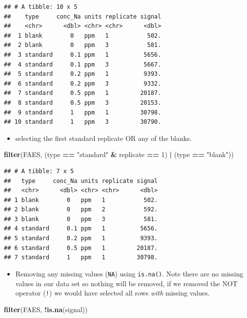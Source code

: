 \documentclass[
]{book}
\newenvironment{Shaded}{\begin{snugshade}}{\end{snugshade}}
\newcommand{\DecValTok}[1]{\textcolor[rgb]{0.00,0.00,0.81}{#1}}
\newcommand{\FunctionTok}[1]{\textcolor[rgb]{0.13,0.29,0.53}{\textbf{#1}}}
\newcommand{\NormalTok}[1]{#1}
\newcommand{\SpecialCharTok}[1]{\textcolor[rgb]{0.81,0.36,0.00}{\textbf{#1}}}
\newcommand{\StringTok}[1]{\textcolor[rgb]{0.31,0.60,0.02}{#1}}
\providecommand{\tightlist}{%
  \setlength{\itemsep}{0pt}\setlength{\parskip}{0pt}}
\begin{document}
\begin{verbatim}
## # A tibble: 10 x 5
##    type     conc_Na units replicate signal
##    <chr>      <dbl> <chr> <chr>      <dbl>
##  1 blank        0   ppm   1           502.
##  2 blank        0   ppm   3           581.
##  3 standard     0.1 ppm   1          5656.
##  4 standard     0.1 ppm   3          5667.
##  5 standard     0.2 ppm   1          9393.
##  6 standard     0.2 ppm   3          9332.
##  7 standard     0.5 ppm   1         20187.
##  8 standard     0.5 ppm   3         20153.
##  9 standard     1   ppm   1         30798.
## 10 standard     1   ppm   3         30790.
\end{verbatim}

\begin{itemize}
\tightlist
\item
  selecting the first standard replicate OR any of the blanks.
\end{itemize}

\begin{Shaded}
\begin{Highlighting}[]
\FunctionTok{filter}\NormalTok{(FAES, (type }\SpecialCharTok{==} \StringTok{"standard"} \SpecialCharTok{\&}\NormalTok{ replicate }\SpecialCharTok{==} \DecValTok{1}\NormalTok{) }\SpecialCharTok{|}\NormalTok{ (type }\SpecialCharTok{==} \StringTok{"blank"}\NormalTok{))}
\end{Highlighting}
\end{Shaded}

\begin{verbatim}
## # A tibble: 7 x 5
##   type     conc_Na units replicate signal
##   <chr>      <dbl> <chr> <chr>      <dbl>
## 1 blank        0   ppm   1           502.
## 2 blank        0   ppm   2           592.
## 3 blank        0   ppm   3           581.
## 4 standard     0.1 ppm   1          5656.
## 5 standard     0.2 ppm   1          9393.
## 6 standard     0.5 ppm   1         20187.
## 7 standard     1   ppm   1         30798.
\end{verbatim}

\begin{itemize}
\tightlist
\item
  Removing any missing values (\texttt{NA}) using \texttt{is.na()}. Note there are no missing values in our data set so nothing will be removed, if we removed the NOT operator (\texttt{!}) we would have selected all rows \emph{with} missing values.
\end{itemize}

\begin{Shaded}
\begin{Highlighting}[]
\FunctionTok{filter}\NormalTok{(FAES, }\SpecialCharTok{!}\FunctionTok{is.na}\NormalTok{(signal))}
\end{Highlighting}
\end{Shaded}
\end{document}
